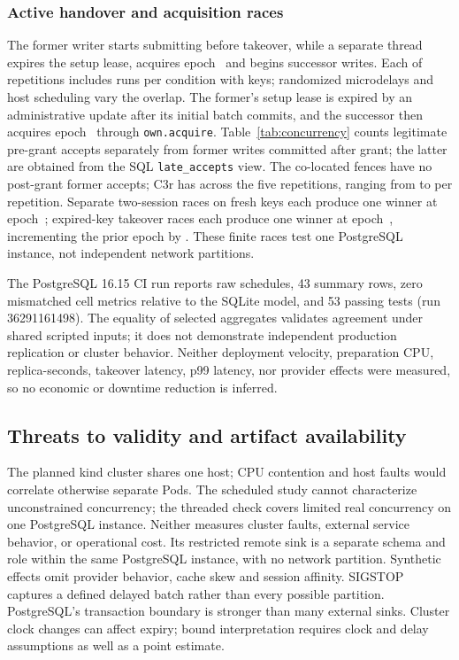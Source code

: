 \documentclass[conference,10pt]{IEEEtran}
\begin{document}
\subsubsection{Active handover and acquisition races}
The former writer starts submitting before takeover, while a separate thread expires the setup lease, acquires epoch~\ObsExpiredEpoch{} and begins successor writes. Each of \ObsThreadRepeats{} repetitions includes \ObsThreadRuns{} runs per condition with \ObsThreadKeys{} keys; randomized microdelays and host scheduling vary the overlap. The former's setup lease is expired by an administrative update after its initial batch commits, and the successor then acquires epoch~\ObsExpiredEpoch{} through \texttt{own.acquire}. Table~\ref{tab:concurrency} counts legitimate pre-grant accepts separately from former writes committed after grant; the latter are obtained from the SQL \texttt{late\_accepts} view. The co-located fences have no post-grant former accepts; C3r has \ObsThreadRemoteTotal{} across the five repetitions, ranging from \ObsThreadRemoteMin{} to \ObsThreadRemoteMax{} per repetition. Separate two-session races on \ObsFreshWins{} fresh keys each produce one winner at epoch~\ObsFreshEpoch{}; \ObsExpiredWins{} expired-key takeover races each produce one winner at epoch~\ObsExpiredEpoch{}, incrementing the prior epoch by \ObsAcquisitionDelta{}. These finite races test one PostgreSQL instance, not independent network partitions.


The PostgreSQL 16.15 CI run reports \ObsRawRuns{} raw schedules, 43 summary rows, zero mismatched cell metrics relative to the SQLite model, and 53 passing tests (run 36291161498). The equality of selected aggregates validates agreement under shared scripted inputs; it does not demonstrate independent production replication or cluster behavior. Neither deployment velocity, preparation CPU, replica-seconds, takeover latency, p99 latency, nor provider effects were measured, so no economic or downtime reduction is inferred.

\subsection{Threats to validity and artifact availability}
The planned kind cluster shares one host; CPU contention and host faults would correlate otherwise separate Pods. The scheduled study cannot characterize unconstrained concurrency; the threaded check covers limited real concurrency on one PostgreSQL instance. Neither measures cluster faults, external service behavior, or operational cost. Its restricted remote sink is a separate schema and role within the same PostgreSQL instance, with no network partition. Synthetic effects omit provider behavior, cache skew and session affinity. SIGSTOP captures a defined delayed batch rather than every possible partition. PostgreSQL's transaction boundary is stronger than many external sinks. Cluster clock changes can affect expiry; bound interpretation requires clock and delay assumptions as well as a point estimate.
\end{document}
